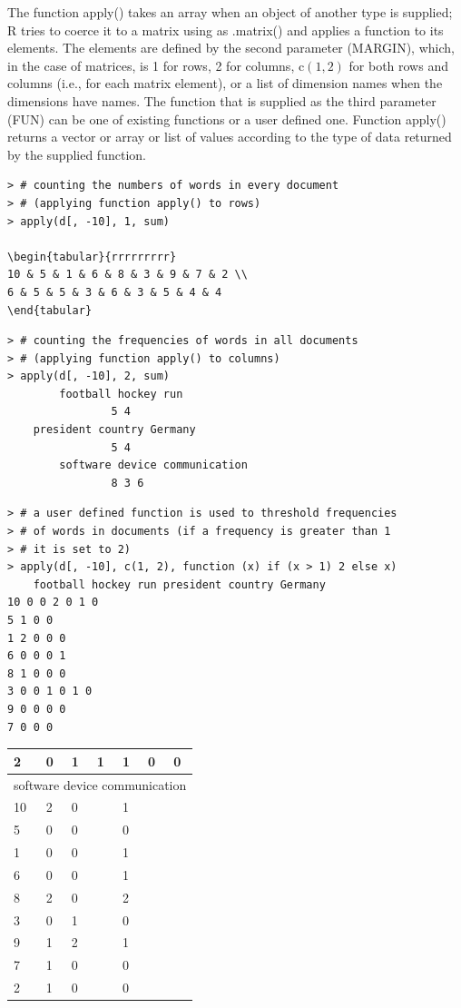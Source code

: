 \documentclass[10pt]{book}
\begin{document}
The function apply() takes an array when an object of another type is supplied; R tries to coerce it to a matrix using as .matrix() and applies a function to its elements. The elements are defined by the second parameter (MARGIN), which, in the case of matrices, is 1 for rows, 2 for columns, $\mathrm{c}(1,2)$ for both rows and columns (i.e., for each matrix element), or a list of dimension names when the dimensions have names. The function that is supplied as the third parameter (FUN) can be one of existing functions or a user defined one. Function apply() returns a vector or array or list of values according to the type of data returned by the supplied function.

\begin{verbatim}
> # counting the numbers of words in every document
> # (applying function apply() to rows)
> apply(d[, -10], 1, sum)

\begin{tabular}{rrrrrrrrr}
10 & 5 & 1 & 6 & 8 & 3 & 9 & 7 & 2 \\
6 & 5 & 5 & 3 & 6 & 3 & 5 & 4 & 4
\end{tabular}
\end{verbatim}

\begin{verbatim}
> # counting the frequencies of words in all documents
> # (applying function apply() to columns)
> apply(d[, -10], 2, sum)
        football hockey run
                5 4
    president country Germany
                5 4
        software device communication
                8 3 6
\end{verbatim}

\begin{verbatim}
> # a user defined function is used to threshold frequencies
> # of words in documents (if a frequency is greater than 1
> # it is set to 2)
> apply(d[, -10], c(1, 2), function (x) if (x > 1) 2 else x)
    football hockey run president country Germany
10 0 0 2 0 1 0
5 1 0 0 
1 2 0 0 0
6 0 0 0 1
8 1 0 0 0
3 0 0 1 0 1 0
9 0 0 0 0
7 0 0 0 
\end{verbatim}

\begin{center}
\begin{tabular}{|l|l|l|l|l|l|l|}
\hline
2 & 0 & 1 & 1 & 1 & 0 & 0 \\
\hline
\multicolumn{7}{|c|}{software device communication} \\
\hline
10 & 2 & 0 &  & 1 &  &  \\
\hline
5 & 0 & 0 &  & 0 &  &  \\
\hline
1 & 0 & 0 &  & 1 &  &  \\
\hline
6 & 0 & 0 &  & 1 &  &  \\
\hline
8 & 2 & 0 &  & 2 &  &  \\
\hline
3 & 0 & 1 &  & 0 &  &  \\
\hline
9 & 1 & 2 &  & 1 &  &  \\
\hline
7 & 1 & 0 &  & 0 &  &  \\
\hline
2 & 1 & 0 &  & 0 &  &  \\
\hline
\end{tabular}
\end{center}
\end{document}
